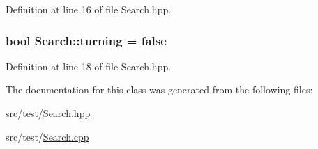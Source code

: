 Definition at line 16 of file Search.\-hpp.

\hypertarget{classSearch_aef5f5e911426d02067e2ac01e5549f1e}{
\subsubsection[{turning}]{\setlength{\rightskip}{0pt plus 5cm}bool Search\-::turning = false\hspace{0.3cm}{\ttfamily [private]}}}\label{classSearch_aef5f5e911426d02067e2ac01e5549f1e}


Definition at line 18 of file Search.\-hpp.



The documentation for this class was generated from the following files\-:\begin{DoxyCompactItemize}
\item 
src/test/\hyperlink{Search_8hpp}{Search.\-hpp}\item 
src/test/\hyperlink{Search_8cpp}{Search.\-cpp}\end{DoxyCompactItemize}

